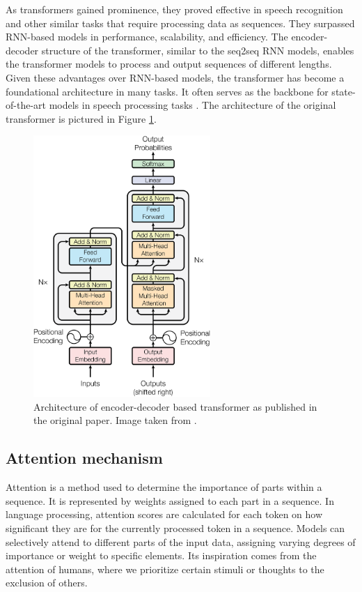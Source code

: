 As transformers gained prominence, they proved effective in speech recognition and other similar tasks that require processing data as sequences. They surpassed RNN-based models in performance, scalability, and efficiency. The encoder-decoder structure of the transformer, similar to the seq2seq RNN models, enables the transformer models to process and output sequences of different lengths. Given these advantages over RNN-based models, the transformer has become a foundational architecture in many tasks. It often serves as the backbone for state-of-the-art models in speech processing tasks \cite{latif2023transformersspeechprocessingsurvey}. The architecture of the original transformer is pictured in Figure \ref{pic:att}.

\begin{figure}[h!]
    \centering
    \includegraphics[width=0.6\textwidth]{obrazky-figures/att.png}
    \caption{Architecture of encoder-decoder based transformer as published in the original paper. Image taken from \cite{vaswani2017attention}.}
    \label{pic:att}
\end{figure}


\subsection{Attention mechanism} \label{attention-theory}
Attention is a method used to determine the importance of parts within a sequence. It is represented by weights assigned to each part in a sequence. In language processing, attention scores are calculated for each token on how significant they are for the currently processed token in a sequence. Models can selectively attend to different parts of the input data, assigning varying degrees of importance or weight to specific elements. Its inspiration comes from the attention of humans, where we prioritize certain stimuli or thoughts to the exclusion of others\cite{Corbetta2002}.


